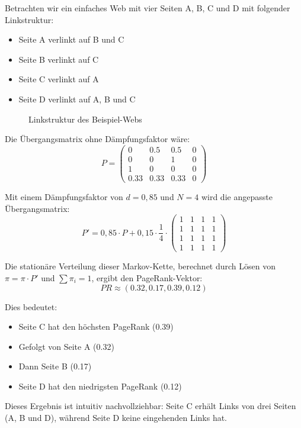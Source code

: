 \begin{myexample}
Betrachten wir ein einfaches Web mit vier Seiten A, B, C und D mit folgender Linkstruktur:
\begin{itemize}
    \item Seite A verlinkt auf B und C
    \item Seite B verlinkt auf C
    \item Seite C verlinkt auf A
    \item Seite D verlinkt auf A, B und C
\end{itemize}

\begin{figure}[H]
    \centering
    \caption{Linkstruktur des Beispiel-Webs}
    \label{fig:pagerank-example}
\end{figure}

Die Übergangsmatrix ohne Dämpfungsfaktor wäre:
\[
    P = \begin{pmatrix}
        0    & 0.5  & 0.5  & 0 \\
        0    & 0    & 1    & 0 \\
        1    & 0    & 0    & 0 \\
        0.33 & 0.33 & 0.33 & 0
    \end{pmatrix}
\]

Mit einem Dämpfungsfaktor von $d = 0{,}85$ und $N = 4$ wird die angepasste Übergangsmatrix:
\[
    P' = 0{,}85 \cdot P + 0{,}15 \cdot \frac{1}{4} \cdot \begin{pmatrix}
        1 & 1 & 1 & 1 \\
        1 & 1 & 1 & 1 \\
        1 & 1 & 1 & 1 \\
        1 & 1 & 1 & 1
    \end{pmatrix}
\]

Die stationäre Verteilung dieser Markov-Kette, berechnet durch Lösen von $\pi = \pi \cdot P'$ und $\sum \pi_i = 1$, ergibt den PageRank-Vektor:
\[
    PR \approx (0.32, 0.17, 0.39, 0.12)
\]

Dies bedeutet:
\begin{itemize}
    \item Seite C hat den höchsten PageRank (0.39)
    \item Gefolgt von Seite A (0.32)
    \item Dann Seite B (0.17)
    \item Seite D hat den niedrigsten PageRank (0.12)
\end{itemize}

Dieses Ergebnis ist intuitiv nachvollziehbar: Seite C erhält Links von drei Seiten (A, B und D), während Seite D keine eingehenden Links hat.
\end{myexample}

